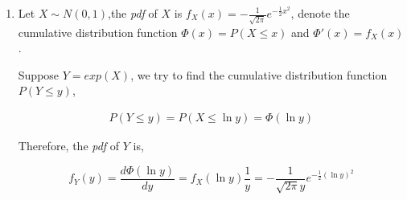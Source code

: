 \documentclass[a4paper]{article}
\begin{document}
\begin{enumerate}
\begin{enumerate}
\begin{proof}
      "$\Longleftarrow$": 

      Suppose $\EX[f(x)] \EX[g(y)] = \EX[f(x)g(y)]$, for all $A,B \in \mathbb{R}$
      Let $f(x)$ be the indicator random variable $f(x) = \mathbb{I}(x\in A)$, $g(y) = \mathbb{I}(y\in B)$
      \begin{equation}
        \begin{aligned}
          P(x\in A, y \in B) &= \EX[\mathbb{I}(x\in A)\mathbb{I}(y\in B)] = \EX[f(x)g(y)] \\
          & = \EX[f(x)]\EX[g(y)] = \EX[\mathbb{I}(x\in A)] \EX[\mathbb{I}(y\in B)] ] \\
          & = P(x\in A) P(y\in B)
        \end{aligned}
      \end{equation}

      So $P_{X,Y}(x,y) = P_X(x)P_Y(y)$ which means $X,Y$ are independent.
    \end{proof}
  \end{enumerate}

  \item Let $X\sim N(0,1)$,the \textit{pdf} of $X$ is $f_X(x) = -\frac {1}{\sqrt{2\pi}} e^{-\frac 1 2 x^2}$, denote the cumulative distribution function $\Phi(x) = P(X\leqslant x )$ and  $\Phi'(x) = f_X(x)$.
  
  Suppose $Y = exp(X)$, we try to find the cumulative distribution function $P(Y\leqslant y)$,

  \begin{equation}
    \begin{aligned}
      P(Y\leqslant y) = P(X\leqslant \ln y) = \Phi(\ln y)
    \end{aligned}
  \end{equation}

  Therefore, the \textit{pdf} of $Y$ is,

  \begin{equation}
    f_Y(y) = \frac {d \Phi(\ln y)}{ dy} = f_X(\ln y) \frac 1 y = -\frac {1}{\sqrt{2\pi} y} e^{-\frac 1 2 (\ln y)^2}
  \end{equation}

  \end{enumerate}
    
\end{document}
